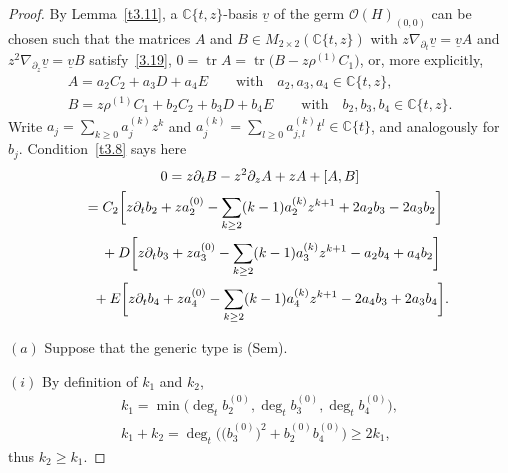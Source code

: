 \documentclass[pdftex]{sigma}%
\numberwithin{equation}{section}
\numberwithin{figure}{section}
\newcommand{\C}{{\mathbb C}}
\newcommand{\OO}{{\mathcal O}}
\newcommand{\uuuu}{\underline}
\newcommand{\paa}{\partial}
\newcommand{\nnn}{\nabla}
\DeclareMathOperator{\tr}{tr}
\begin{document}
\begin{proof}
By Lemma~\ref{t3.11}, a $\C\{t,z\}$-basis $\uuuu{v}$
of the germ $\OO(H)_{(0,0)}$
can be chosen such that the matrices
$A$ and $B\in M_{2\times 2}(\C\{t,z\})$ with
$z\nnn_{\paa_t}\uuuu{v}=\uuuu{v} A$ and
$z^2\nnn_{\paa_z}\uuuu{v}=\uuuu{v} B$ satisfy~\eqref{3.19},
$0=\tr A=\tr\big(B-z\rho^{(1)} C_1\big)$, or, more explicitly,
\begin{gather*}
A= a_2C_2+a_3D+a_4E\qquad\text{with}\quad
a_2,a_3,a_4 \in \C\{t,z\},
\\
B= z\rho^{(1)}C_1+b_2C_2+b_3D+b_4E\qquad\text{with}\quad
b_2,b_3,b_4\in\C\{t,z\}.
\end{gather*}
Write $a_j=\sum_{k\geq 0}a_j^{(k)}z^k$ and
$a_j^{(k)}=\sum_{l\geq 0}a_{j,l}^{(k)}t^l\in\C\{t\}$,
and analogously for $b_j$.
Condition~\eqref{t3.8} says here
\begin{gather}
0= z\paa_tB-z^2\paa_z A + zA +[A,B]\nonumber
\\ \hphantom{0}
{}= C_2\bigg[ z\paa_t b_2 + za_2^{(0)} -
\sum_{k\geq 2}(k-1)a_2^{(k)}z^{k+1}+2a_2b_3-2a_3b_2\bigg]
\label{6.5}
\\ \hphantom{0=}
{}+ D\bigg[z\paa_tb_3 + za_3^{(0)} -
\sum_{k\geq 2}(k-1)a_3^{(k)}z^{k+1}-a_2b_4+a_4b_2\bigg]
\label{6.6}
\\ \hphantom{0=}
{}+E\bigg[ z\paa_t b_4 + za_4^{(0)} -
\sum_{k\geq 2}(k-1)a_4^{(k)}z^{k+1}-2a_4b_3+2a_3b_4\bigg].
\label{6.7}
\end{gather}

\medskip
$(a)$ Suppose that the generic type is (Sem).

\medskip
$(i)$ By definition of $k_1$ and $k_2$,
\begin{gather}\label{6.8}
k_1 = \min\big(\deg_tb_2^{(0)},\deg_tb_3^{(0)},\deg_tb_4^{(0)}\big),
\\
k_1+k_2= \deg_t\big(\big(b_3^{(0)}\big)^2+b_2^{(0)}b_4^{(0)}\big)\geq 2k_1,
\label{6.9}
\end{gather}
thus $k_2\geq k_1$.


\end{proof}
\end{document}
